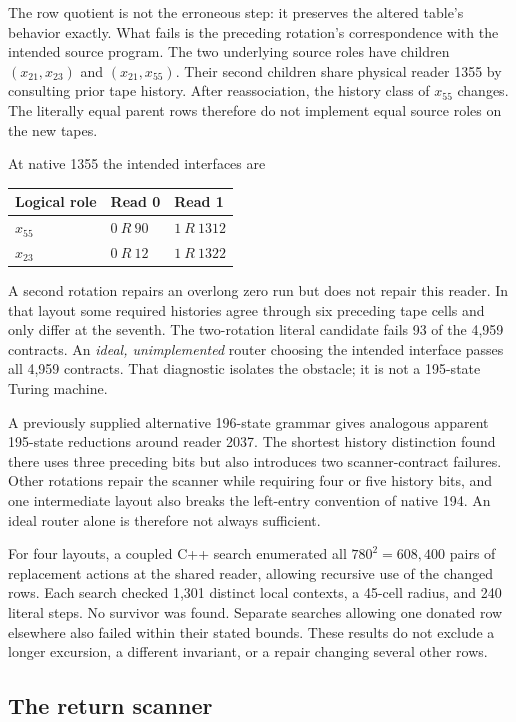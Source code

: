 \documentclass[11pt,a4paper]{article}
\begin{document}
The row quotient is not the erroneous step: it preserves the altered table's behavior exactly. What fails is the preceding rotation's correspondence with the intended source program. The two underlying source roles have children $(x_{21},x_{23})$ and $(x_{21},x_{55})$. Their second children share physical reader 1355 by consulting prior tape history. After reassociation, the history class of $x_{55}$ changes. The literally equal parent rows therefore do not implement equal source roles on the new tapes.

At native 1355 the intended interfaces are
\begin{center}
\begin{tabular}{lll}
\toprule
Logical role & Read 0 & Read 1\\
\midrule
$x_{55}$ & $0\ R\ 90$ & $1\ R\ 1312$\\
$x_{23}$ & $0\ R\ 12$ & $1\ R\ 1322$\\
\bottomrule
\end{tabular}
\end{center}
A second rotation repairs an overlong zero run but does not repair this reader. In that layout some required histories agree through six preceding tape cells and only differ at the seventh. The two-rotation literal candidate fails 93 of the 4,959 contracts. An \emph{ideal, unimplemented} router choosing the intended interface passes all 4,959 contracts. That diagnostic isolates the obstacle; it is not a 195-state Turing machine.

A previously supplied alternative 196-state grammar gives analogous apparent 195-state reductions around reader 2037. The shortest history distinction found there uses three preceding bits but also introduces two scanner-contract failures. Other rotations repair the scanner while requiring four or five history bits, and one intermediate layout also breaks the left-entry convention of native 194. An ideal router alone is therefore not always sufficient.

For four layouts, a coupled C++ search enumerated all $780^2=608,400$ pairs of replacement actions at the shared reader, allowing recursive use of the changed rows. Each search checked 1,301 distinct local contexts, a 45-cell radius, and 240 literal steps. No survivor was found. Separate searches allowing one donated row elsewhere also failed within their stated bounds. These results do not exclude a longer excursion, a different invariant, or a repair changing several other rows.

\subsection{The return scanner}
\end{document}
